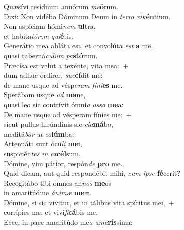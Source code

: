 \evenverse Quæsívi resíduum annórum \textit{me}\textbf{ó}rum.~\*\\
\evenverse Dixi: Non vidébo Dóminum Deum in \textit{ter}\textit{ra} \textit{vi}\textbf{vén}tium.\\
\oddverse Non aspíciam hómi\textit{nem} \textbf{ul}tra,~\*\\
\oddverse et habita\textit{tó}\textit{rem} \textit{qui}\textbf{é}tis.\\
\evenverse Generátio mea abláta est, et convolúta \textit{est} \textbf{a} me,~\*\\
\evenverse quasi taberná\textit{cu}\textit{lum} \textit{pa}\textbf{stó}rum.\\
\oddverse Præcísa est velut a texénte, vita mea:~+\\
\oddverse  dum adhuc ordírer, \textit{suc}\textbf{cí}dit me:~\*\\
\oddverse de mane usque ad véspe\textit{ram} \textit{fí}\textit{ni}\textbf{es} me.\\
\evenverse Sperábam usque \textit{ad} \textbf{ma}ne,~\*\\
\evenverse quasi leo sic contrívit ómni\textit{a} \textit{os}\textit{sa} \textbf{me}a:\\
\oddverse De mane usque ad vésperam fínies me:~+\\
\oddverse  sicut pullus hirúndinis sic \textit{cla}\textbf{má}bo,~\*\\
\oddverse meditá\textit{bor} \textit{ut} \textit{co}\textbf{lúm}ba:\\
\evenverse Attenuáti sunt ócu\textit{li} \textbf{me}i,~\*\\
\evenverse suspicién\textit{tes} \textit{in} \textit{ex}\textbf{cél}sum.\\
\oddverse Dómine, vim pátior, respón\textit{de} \textbf{pro} me.~\*\\
\oddverse Quid dicam, aut quid respondébit mihi, \textit{cum} \textit{i}\textit{pse} \textbf{fé}cerit?\\
\evenverse Recogitábo tibi omnes an\textit{nos} \textbf{me}os~\*\\
\evenverse in amaritúdine \textit{á}\textit{ni}\textit{mæ} \textbf{me}æ.\\
\oddverse Dómine, si sic vívitur, et in tálibus vita spíritus mei,~+\\
\oddverse  corrípies me, et vivi\textit{fi}\textbf{cá}bis me.~\*\\
\oddverse Ecce, in pace amaritúdo me\textit{a} \textit{a}\textit{ma}\textbf{rís}sima:\\
